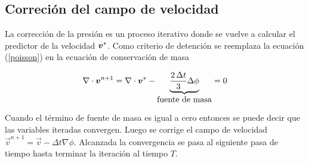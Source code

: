 \subsection{Correción del campo de velocidad}

La corrección de la presión es un proceso iterativo donde se vuelve a calcular el predictor de la velocidad $\boldsymbol{v}^*$. Como criterio de detención se reemplaza la ecuación (\ref{poisson}) en la ecuación de conservación de masa

\begin{equation}
\nabla \cdot \boldsymbol{v}^{n+1} = \nabla \cdot \boldsymbol{v}^* - \underbrace{ \dfrac{2 \, \Delta t}{3} \Delta \phi }_{\mbox{fuente de masa}} = 0
\end{equation}

Cuando el término de fuente de masa es igual a cero entonces se puede decir que las variables iteradas convergen. Luego se corrige el campo de velocidad $\vec{v}^{n+1} = \vec{v} - \Delta t \nabla \phi$. Alcanzada la convergencia se pasa al siguiente pasa de tiempo hasta terminar la iteración al tiempo $T$.